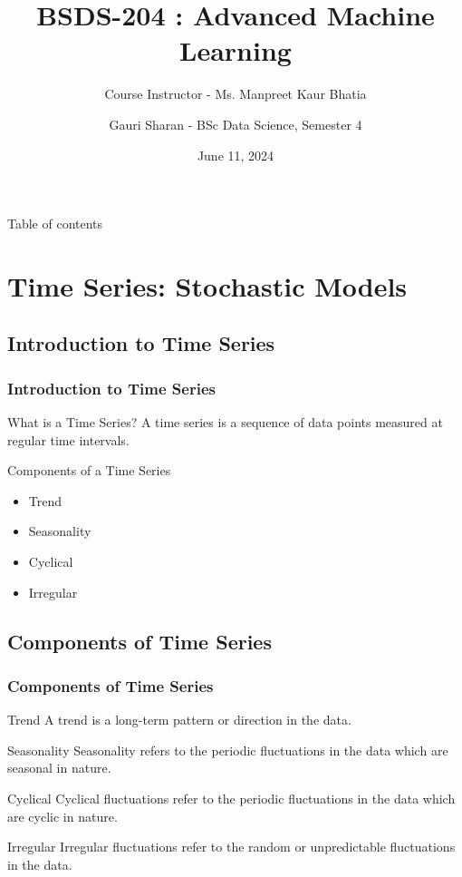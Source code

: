 \documentclass[aspectratio=169, hideothersubsections]{beamer}
\title{BSDS-204 : Advanced Machine Learning}
\subtitle{Course Instructor - Ms. Manpreet Kaur Bhatia}
\author[Gauri Sharan]{Gauri Sharan - BSc Data Science, Semester 4}
\date{June 11, 2024}
\begin{document}
\frame{\titlepage}

\begin{frame}{Table of contents}
    \tableofcontents[hideallsubsections]
\end{frame}

\section{Time Series: Stochastic Models}

\subsection{Introduction to Time Series}

\begin{frame}
  \frametitle{Introduction to Time Series}
  \begin{block}{What is a Time Series?}
    A time series is a sequence of data points measured at regular time intervals.
  \end{block}
  \begin{block}{Components of a Time Series}
    \begin{itemize}
      \item Trend
      \item Seasonality
      \item Cyclical
      \item Irregular
    \end{itemize}
  \end{block}
\end{frame}

\subsection{Components of Time Series}

\begin{frame}
  \frametitle{Components of Time Series}
  \begin{block}{Trend}
    A trend is a long-term pattern or direction in the data.
  \end{block}
  \begin{block}{Seasonality}
    Seasonality refers to the periodic fluctuations in the data which are seasonal in nature.
  \end{block}
  \begin{block}{Cyclical}
    Cyclical fluctuations refer to the periodic fluctuations in the data which are cyclic in nature.
  \end{block}
  \begin{block}{Irregular}
    Irregular fluctuations refer to the random or unpredictable fluctuations in the data.
  \end{block}
\end{frame}
\end{document}

